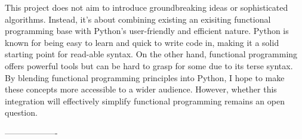 \documentclass{l4proj}
\begin{document}
This project does not aim to introduce groundbreaking ideas or sophisticated algorithms. 
Instead, it's about combining existing an exisiting functional programming base with Python's user-friendly and efficient nature.
Python is known for being easy to learn and quick to write code in, making it a solid starting point for read-able syntax.
On the other hand, functional programming offers powerful tools but can be hard to grasp for some due to its terse syntax.
By blending functional programming principles into Python, I hope to make these concepts more accessible to a wider audience.
However, whether this integration will effectively simplify functional programming remains an open question.




\begin{center}
    -------------------
\end{center}






\end{document}
